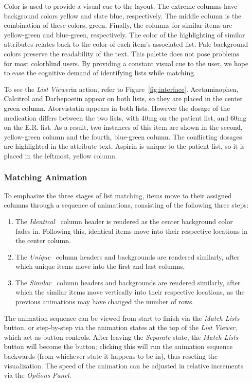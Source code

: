 \documentclass{chi2009}
\newcommand{\ListViewer}{\textit{List Viewer}}
\newcommand{\Options}{\textit{Options Panel}}
\newcommand{\Similar}{\textit{Similar}}
\newcommand{\Identical}{\textit{Identical}}
\newcommand{\Unique}{\textit{Unique}}
\begin{document}
Color is used to provide a visual cue to the layout. The extreme columns have background colors yellow and slate blue, respectively. The middle column is the combination of these colors, green. Finally, the columns for similar items are yellow-green and blue-green, respectively. The color of the highlighting of similar attributes relates back to the color of each item's associated list. Pale background colors preserve the readability of the text. This palette does not pose problems for most colorblind users. By providing a constant visual cue to the user, we hope to ease the cognitive demand of identifying lists while matching.

To see the \ListViewer in action, refer to Figure~\ref{fig:interface}. Acetaminophen, Calcitrol and Darbepoetin appear on both lists, so they are placed in the center green column. Atorvistatin appears in both lists. However the dosage of the medication differs between the two lists, with 40mg on the patient list, and 60mg on the E.R. list. As a result, two instances of this item are shown in the second, yellow-green column and the fourth, blue-green column. The conflicting dosages are highlighted in the attribute text. Aspirin is unique to the patient list, so it is placed in the leftmost, yellow column.

\subsubsection{Matching Animation}
To emphasize the three stages of list matching, items move to their assigned columns through a sequence of animations, consisting of the following three steps:
\begin{enumerate}
\item The \Identical~ column header is rendered as the center background color fades in. Following this, identical items move into their respective locations in the center column.
\item The \Unique~ column headers and backgrounds are rendered similarly, after which unique items move into the first and last columns.
\item The \Similar~ column headers and backgrounds are rendered similarly, after which the similar items move vertically into their respective locations, as the previous animations may have changed the number of rows.
\end{enumerate}

The animation sequence can be viewed from start to finish via the \textit{Match Lists} button, or step-by-step via the animation states at the top of the \ListViewer, which act as button controls. After leaving the \textit{Separate} state, the \textit{Match Lists} button will become the  button; clicking this will run the animation sequence backwards (from whichever state it happens to be in), thus reseting the visualization. The speed of the animation can be adjusted in relative increments via the \Options.
\end{document}
